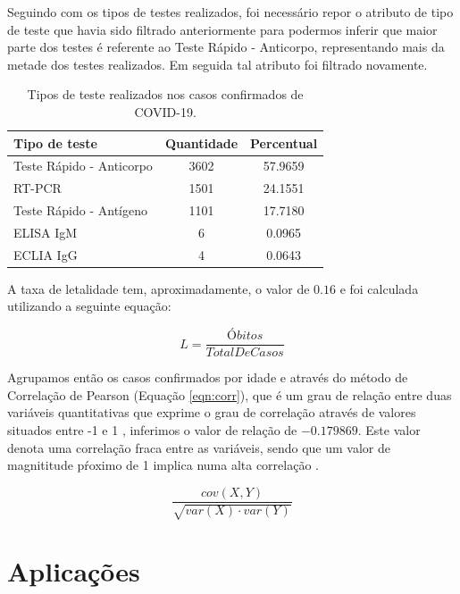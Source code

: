 \documentclass[12pt]{article}
\begin{document}
Seguindo com os tipos de testes realizados, foi necessário repor o atributo de tipo de teste que havia sido filtrado anteriormente para podermos inferir que maior parte dos testes é referente ao Teste Rápido - Anticorpo, representando mais da metade dos testes realizados. Em seguida tal atributo foi filtrado novamente.
\begin{table}[hbt!]
\centering
\caption{Tipos de teste realizados nos casos confirmados de COVID-19.}
\begin{tabular}{|l|c|c|}
	\hline
	Tipo de teste & Quantidade & Percentual\\
	\hline
    Teste Rápido - Anticorpo & 3602 & 57.9659\\
    \hline
    RT-PCR                   & 1501 & 24.1551\\
    \hline
    Teste Rápido - Antígeno  & 1101 & 17.7180\\
    \hline
    ELISA IgM                & 6     & 0.0965\\
    \hline                   
    ECLIA IgG                & 4     & 0.0643\\

	\hline

\end{tabular}
\end{table}

A taxa de letalidade tem, aproximadamente, o valor de $0.16$ e foi calculada utilizando a seguinte equação:

\begin{equation}
L=\frac{Óbitos}{TotalDeCasos}  
\end{equation}

Agrupamos então os casos confirmados por idade e através do método de Correlação de Pearson (Equação \ref{eqn:corr}), que é um grau de relação entre duas variáveis quantitativas que exprime o grau de correlação através de valores situados entre -1 e 1 \cite{pearson}, inferimos o valor de relação de $-0.179869$. Este valor denota uma correlação fraca entre as variáveis, sendo que um valor de magnititude pŕoximo de 1 implica numa alta correlação \cite{atoumscaled}.

\begin{equation}
    \frac{cov(X,Y)}{\sqrt{var(X)\cdot var(Y)}}
    \label{eqn:corr}
\end{equation}


\section{Aplicações}
\end{document}
